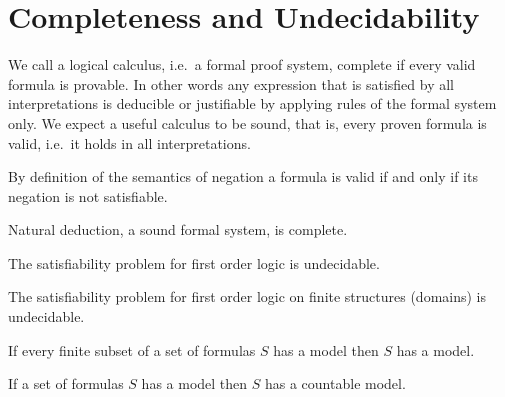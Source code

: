 

\chapter{Completeness and Undecidability}

	We call a logical calculus, i.e.~a formal proof system, {\myem complete} if every valid formula is provable.
	In other words any expression that is satisfied by all interpretations 
	is deducible or justifiable by applying rules of the formal system only.
	We expect a useful calculus to be {\myem sound}, that is, every proven formula is valid, 
	i.e.~it holds in all interpretations.

\begin{lemma}[Refutation]
	By definition of the semantics of negation a formula is valid if and only if its negation is not satisfiable.
\end{lemma}

\begin{theorem}
	Natural deduction, a sound formal system, is complete.
\end{theorem}

\begin{theorem}
	The satisfiability problem for first order logic is undecidable.
\end{theorem}

\begin{theorem}
	The satisfiability problem for first order logic on {\myem finite} structures (domains) is undecidable.
\end{theorem}

\begin{theorem}
\end{theorem}








\begin{theorem}[Compactness]\label{the:compactness}
	If every finite subset of a set of formulas $S$ has a model then $S$ has a model. 
\end{theorem}

\begin{theorem}\label{the:loewenheim}
	If a set of formulas $S$ has a model then $S$ has a countable model.
\end{theorem}

